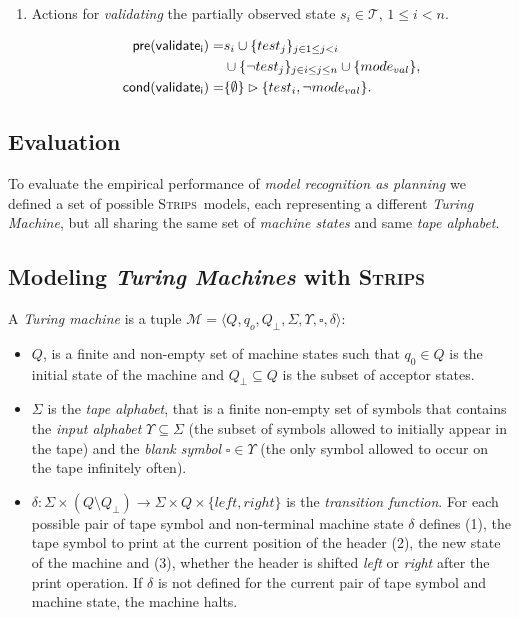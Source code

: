 \documentclass[letterpaper]{article} %
\newcommand{\tup}[1]{{\langle #1 \rangle}}
\newcommand{\pre}{\mathsf{pre}}     %
\newcommand{\cond}{\mathsf{cond}}   %
\newcommand{\strips}{\textsc{Strips}}     %
\begin{document}
\begin{itemize}
\begin{enumerate}
\item Actions for {\em validating} the partially observed state $s_i\in\mathcal{T}$, {\tt\small $1\leq i< n$}.
\begin{small}
\begin{align*}
\hspace*{7pt}\pre(\mathsf{validate_{i}})=&s_i\cup\{test_j\}_{j\in 1\leq j<i}\\
&\cup\{\neg test_j\}_{j\in i\leq j\leq n}\cup \{mode_{val}\},\\
\cond(\mathsf{validate_{i}})=&\{\emptyset\}\rhd\{test_i,\neg mode_{val}\}.
\end{align*}
\end{small}
\end{enumerate}
\end{itemize}


\subsection{Evaluation}
\label{sec:evaluation}
To evaluate the empirical performance of {\em model recognition as planning} we defined a set of possible \strips\ models, each representing a different {\em Turing Machine}, but all sharing the same set of {\em machine states} and same {\em tape alphabet}.

\subsection{Modeling {\em Turing Machines} with \strips\ }
A {\em Turing machine} is a tuple $\mathcal{M}=\tup{Q,q_o,Q_{\bot},\Sigma,\Upsilon,\square,\delta}$:
\begin{itemize}
\item $Q$, is a finite and non-empty set of machine states such that $q_0\in Q$ is the initial state of the machine and $Q_{\bot}\subseteq Q$ is the subset of acceptor states.  
\item $\Sigma$ is the {\em tape alphabet}, that is a finite non-empty set of symbols that contains the {\em input alphabet} $\Upsilon\subseteq\Sigma$ (the subset of symbols allowed to initially appear in the tape) and the {\em blank symbol} $\square\in\Upsilon$ (the only symbol allowed to occur on the tape infinitely often).
\item $\delta: \Sigma\times (Q\setminus Q_{\bot}) \rightarrow \Sigma\times Q\times\{left,right\}$ is the {\em transition function}. For each possible pair of tape symbol and non-terminal machine state $\delta$ defines (1), the tape symbol to print at the current position of the header (2), the new state of the machine and (3), whether the header is shifted {\em left} or {\em right} after the print operation. If $\delta$ is not defined for the current pair of tape symbol and machine state, the machine halts.
\end{itemize}
\end{document}
